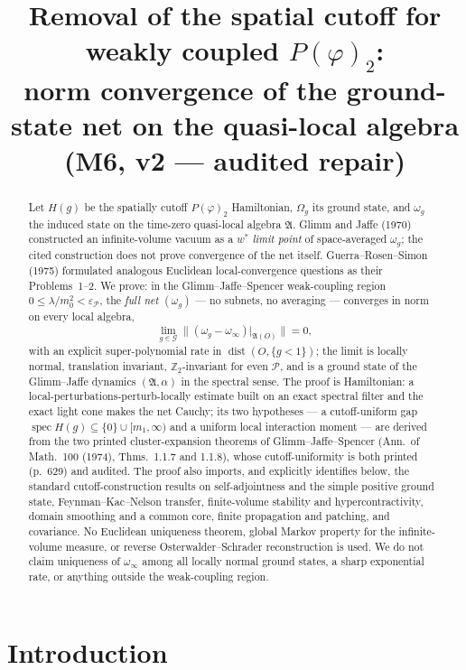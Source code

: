 \documentclass[11pt,a4paper]{article}
\title{Removal of the spatial cutoff for weakly coupled $P(\varphi)_2$:\\
norm convergence of the ground-state net on the quasi-local algebra\\[4pt]
\large (M6, v2 --- audited repair)}
\author{}
\date{}
\theoremstyle{plain}
\theoremstyle{definition}
\newcommand{\Z}{\mathbb{Z}}
\newcommand{\A}{\mathfrak{A}}
\newcommand{\G}{\mathcal{G}}
\newcommand{\Om}{\Omega}
\DeclareMathOperator{\dist}{dist}
\DeclareMathOperator{\spec}{spec}
\begin{document}
\maketitle

\begin{abstract}
Let $H(g)$ be the spatially cutoff $P(\varphi)_2$ Hamiltonian, $\Om_g$ its ground state, and
$\omega_g$ the induced state on the time-zero quasi-local algebra $\A$. Glimm and Jaffe (1970)
constructed an infinite-volume vacuum as a $w^*$ \emph{limit point} of space-averaged $\omega_g$;
the cited construction does not prove convergence of the net itself. Guerra--Rosen--Simon
(1975) formulated analogous Euclidean local-convergence questions as their Problems~1--2.
We prove: in the Glimm--Jaffe--Spencer weak-coupling region
$0\le\lambda/m_0^2<\varepsilon_{\mathscr P}$, the \emph{full net} $(\omega_g)$ --- no subnets, no
averaging --- converges in norm on every local algebra,
\[
  \lim_{g\in\G}\bigl\|(\omega_g-\omega_\infty)|_{\A(O)}\bigr\|=0 ,
\]
with an explicit super-polynomial rate in $\dist(O,\{g<1\})$; the limit is locally normal,
translation invariant, $\Z_2$-invariant for even $\mathscr P$, and is a ground state of the
Glimm--Jaffe dynamics $(\A,\alpha)$ in the spectral sense. The proof is Hamiltonian: a
local-perturbations-perturb-locally estimate built on an exact spectral filter and the exact
light cone makes the net Cauchy; its two hypotheses --- a cutoff-uniform gap
$\spec H(g)\subseteq\{0\}\cup[m_1,\infty)$ and a uniform local interaction moment --- are derived
from the two printed cluster-expansion theorems of Glimm--Jaffe--Spencer (Ann.\ of Math.\ 100
(1974), Thms.~1.1.7 and 1.1.8), whose cutoff-uniformity is both printed (p.~629) and audited.
The proof also imports, and explicitly identifies below, the standard cutoff-construction
results on self-adjointness and the simple positive ground state, Feynman--Kac--Nelson transfer,
finite-volume stability and hypercontractivity, domain smoothing and a common core, finite
propagation and patching, and covariance. No Euclidean uniqueness theorem, global Markov
property for the infinite-volume measure, or reverse Osterwalder--Schrader reconstruction is
used. We do not claim uniqueness of $\omega_\infty$ among all locally normal ground states, a
sharp exponential rate, or anything outside the weak-coupling region.
\end{abstract}

\tableofcontents

\section{Introduction}\label{sec:intro}
\end{document}
